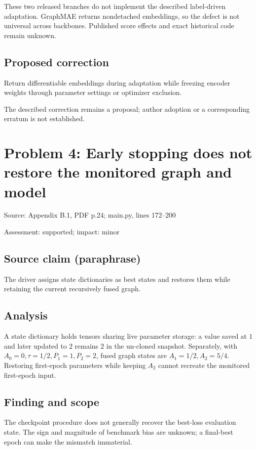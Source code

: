 \documentclass[11pt]{article}
\begin{document}
These two released branches do not implement the described label-driven adaptation. GraphMAE returns nondetached embeddings, so the defect is not universal across backbones. Published score effects and exact historical code remain unknown.

\subsection*{Proposed correction}

Return differentiable embeddings during adaptation while freezing encoder weights through parameter settings or optimizer exclusion.

The described correction remains a proposal; author adoption or a corresponding erratum is not established.

\section*{Problem 4: Early stopping does not restore the monitored graph and model}

Source: Appendix B.1, PDF p.24; main.py, lines 172–200

Assessment: supported; impact: minor

\subsection*{Source claim (paraphrase)}

The driver assigns state dictionaries as best states and restores them while retaining the current recursively fused graph.

\subsection*{Analysis}

A state dictionary holds tensors sharing live parameter storage: a value saved at \(1\) and later updated to \(2\) remains \(2\) in the un-cloned snapshot. Separately, with \(A_0=0,\tau=1/2,P_1=1,P_2=2\), fused graph states are \(A_1=1/2,A_2=5/4\). Restoring first-epoch parameters while keeping \(A_2\) cannot recreate the monitored first-epoch input.

\subsection*{Finding and scope}

The checkpoint procedure does not generally recover the best-loss evaluation state. The sign and magnitude of benchmark bias are unknown; a final-best epoch can make the mismatch immaterial.
\end{document}
